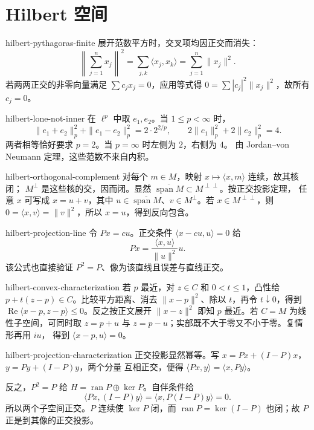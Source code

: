 \chapter{Hilbert 空间}

\begin{solution}{hilbert-pythagoras-finite}
展开范数平方时，交叉项均因正交而消失：
\[
 \left\|\sum_{j=1}^n x_j\right\|^2
 =\sum_{j,k}\langle x_j,x_k\rangle=\sum_{j=1}^n\|x_j\|^2.
\]
若两两正交的非零向量满足 \(\sum c_jx_j=0\)，应用等式得
\(0=\sum|c_j|^2\|x_j\|^2\)，故所有 \(c_j=0\)。
\end{solution}

\begin{solution}{hilbert-lone-not-inner}
在 \(\ell^p\) 中取 \(e_1,e_2\)。当 \(1\le p<\infty\) 时，
\[
 \|e_1+e_2\|_p^2+\|e_1-e_2\|_p^2=2\cdot2^{2/p},
 \qquad 2\|e_1\|_p^2+2\|e_2\|_p^2=4.
\]
两者相等恰好要求 \(p=2\)。当 \(p=\infty\) 时左侧为 \(2\)，右侧为 \(4\)。
由 Jordan--von Neumann 定理，这些范数不来自内积。
\end{solution}

\begin{solution}{hilbert-orthogonal-complement}
对每个 \(m\in M\)，映射 \(x\mapsto\langle x,m\rangle\) 连续，故其核闭；
\(M^\perp\) 是这些核的交，因而闭。显然
\(\overline{\operatorname{span}M}\subset M^{\perp\perp}\)。按正交投影定理，
任意 \(x\) 可写成 \(x=u+v\)，其中
\(u\in\overline{\operatorname{span}M}\)、\(v\in M^\perp\)。若
\(x\in M^{\perp\perp}\)，则 \(0=\langle x,v\rangle=\|v\|^2\)，所以
\(x=u\)，得到反向包含。
\end{solution}

\begin{solution}{hilbert-projection-line}
令 \(P x=cu\)。正交条件
\(\langle x-cu,u\rangle=0\) 给
\[
 P x=\frac{\langle x,u\rangle}{\|u\|^2}u.
\]
该公式也直接验证 \(P^2=P\)、像为该直线且误差与直线正交。
\end{solution}

\begin{solution}{hilbert-convex-characterization}
若 \(p\) 最近，对 \(z\in C\) 和 \(0<t\le1\)，凸性给
\(p+t(z-p)\in C\)。比较平方距离、消去 \(\|x-p\|^2\)、除以 \(t\)，再令
\(t\downarrow0\)，得到
\(\operatorname{Re}\langle x-p,z-p\rangle\le0\)。反之按正文展开
\(\|x-z\|^2\) 即知 \(p\) 最近。若 \(C=M\) 为线性子空间，可同时取
\(z=p+u\) 与 \(z=p-u\)；实部既不大于零又不小于零。复情形再用 \(iu\)，
得到 \(\langle x-p,u\rangle=0\)。
\end{solution}

\begin{solution}{hilbert-projection-characterization}
正交投影显然幂等。写 \(x=Px+(I-P)x\)，\(y=Py+(I-P)y\)，两个分量
互相正交，便得 \(\langle Px,y\rangle=\langle x,Py\rangle\)。

反之，\(P^2=P\) 给 \(H=\operatorname{ran}P\oplus\ker P\)。自伴条件给
\[
 \langle Px,(I-P)y\rangle
 =\langle x,P(I-P)y\rangle=0.
\]
所以两个子空间正交。\(P\) 连续使 \(\ker P\) 闭，而
\(\operatorname{ran}P=\ker(I-P)\) 也闭；故 \(P\) 正是到其像的正交投影。
\end{solution}

